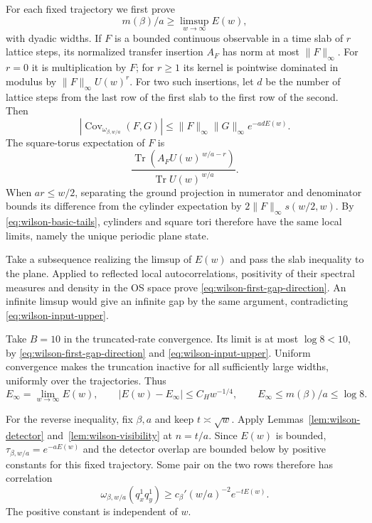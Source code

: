 For each fixed trajectory we first prove
\begin{equation}
 m(\beta)/a\ge\limsup_{w\to\infty}E(w),
 \label{eq:wilson-first-gap-direction}
\end{equation}
with dyadic widths. If $F$ is a bounded continuous observable
in a time slab of $r$ lattice steps, its normalized transfer
insertion $A_F$ has norm at most $\|F\|_\infty$. For $r=0$ it is
multiplication by $F$; for $r\ge1$ its kernel is pointwise dominated
in modulus by $\|F\|_\infty U(w)^r$.
For two such insertions, let $d$ be the number of lattice steps from
the last row of the first slab to the first row of the second. Then
\[
 |\operatorname{Cov}_{\omega_{\beta,w/a}}(F,G)|
 \le\|F\|_\infty\|G\|_\infty e^{-adE(w)}.
\]
The square-torus expectation of $F$ is
\[
 \frac{\operatorname{Tr}(A_F U(w)^{\,w/a-r})}
      {\operatorname{Tr}U(w)^{\,w/a}}.
\]
When $ar\le w/2$, separating the ground projection in
numerator and denominator bounds its difference from the
cylinder expectation by $2\|F\|_\infty s(w/2,w)$.
By \eqref{eq:wilson-basic-tails}, cylinders and square tori
therefore have the same local limits, namely the unique
periodic plane state.

Take a subsequence realizing the limsup of $E(w)$ and pass
the slab inequality to the plane. Applied to reflected local
autocorrelations, positivity of their spectral measures and
density in the OS space prove
\eqref{eq:wilson-first-gap-direction}. An infinite limsup would
give an infinite gap by the same argument, contradicting
\eqref{eq:wilson-input-upper}.

Take $B=10$ in the truncated-rate convergence. Its limit
is at most $\log8<10$, by
\eqref{eq:wilson-first-gap-direction} and
\eqref{eq:wilson-input-upper}. Uniform convergence makes the
truncation inactive for all sufficiently large widths,
uniformly over the trajectories. Thus
\begin{equation}
 E_\infty=\lim_{w\to\infty}E(w),\qquad
 |E(w)-E_\infty|\le C_Hw^{-1/4},\qquad
 E_\infty\le m(\beta)/a\le\log8.
 \label{eq:wilson-cylinder-limit}
\end{equation}

For the reverse inequality, fix $\beta,a$ and keep
$t\asymp\sqrt w$. Apply Lemmas~\ref{lem:wilson-detector}
and~\ref{lem:wilson-visibility} at $n=t/a$.
Since $E(w)$ is bounded, $\tau_{\beta,w/a}=e^{-aE(w)}$
and the detector overlap are bounded below by positive
constants for this fixed trajectory. Some pair on the two
rows therefore has correlation
\begin{equation}
 \omega_{\beta,w/a}(q_x^1q_y^1)
 \ge c_\beta'(w/a)^{-2}e^{-tE(w)}.
 \label{eq:wilson-visible-pair}
\end{equation}
The positive constant is independent of $w$.

